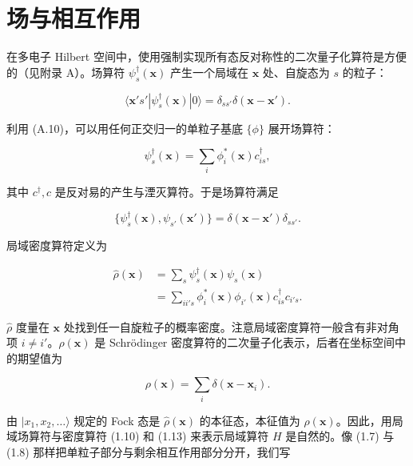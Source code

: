 \section{场与相互作用}

在多电子 Hilbert 空间中，使用强制实现所有态反对称性的二次量子化算符是方便的（见附录 A）。场算符 $\psi_{s}^{\dagger}(\mathbf{x})$ 产生一个局域在 $\mathbf{x}$ 处、自旋态为 $s$ 的粒子：

\begin{equation*}
\langle \mathbf {x} ' s ' | \psi_ {s} ^ {\dagger} (\mathbf {x}) | 0 \rangle = \delta_ {ss'} \delta (\mathbf {x} - \mathbf {x} ').
\tag{1.9}
\end{equation*}

利用 (A.10)，可以用任何正交归一的单粒子基底 $\{\phi\}$ 展开场算符：

\begin{equation*}
\psi_ {s} ^ {\dagger} (\mathbf {x}) = \sum_ {i} \phi_ {i} ^ {*} (\mathbf {x}) c _ {is} ^ {\dagger},
\tag{1.10}
\end{equation*}

其中 $c^{\dagger}, c$ 是反对易的产生与湮灭算符。于是场算符满足

\begin{equation*}
\{ \psi_ {s} ^ {\dagger} (\mathbf {x}), \psi_ {s '} (\mathbf {x} ') \} = \delta (\mathbf {x} - \mathbf {x} ') \delta_ {ss'}.
\tag{1.11}
\end{equation*}

局域密度算符定义为

\begin{align*}
\hat {\rho} (\mathbf {x}) & = \sum_ {s} \psi_ {s} ^ {\dagger} (\mathbf {x}) \psi_ {s} (\mathbf {x})
\tag{1.12}\\
& = \sum_ {ii's} \phi_ {i} ^ {*} (\mathbf {x}) \phi_ {i '} (\mathbf {x}) c _ {is} ^ {\dagger} c _ {i's}.
\tag{1.13}
\end{align*}

$\hat{\rho}$ 度量在 $\mathbf{x}$ 处找到任一自旋粒子的概率密度。注意局域密度算符一般含有非对角项 $i \neq i'$。$\hat{\rho}(\mathbf{x})$ 是 Schrödinger 密度算符的二次量子化表示，后者在坐标空间中的期望值为

\begin{equation*}
\rho (\mathbf {x}) = \sum_ {i} \delta (\mathbf {x} - \mathbf {x} _ {i}).
\tag{1.14}
\end{equation*}

由 $|x_{1}, x_{2}, \ldots\rangle$ 规定的 Fock 态是 $\hat{\rho}(\mathbf{x})$ 的本征态，本征值为 $\rho(\mathbf{x})$。因此，用局域场算符与密度算符 (1.10) 和 (1.13) 来表示局域算符 $H$ 是自然的。像 (1.7) 与 (1.8) 那样把单粒子部分与剩余相互作用部分分开，我们写

